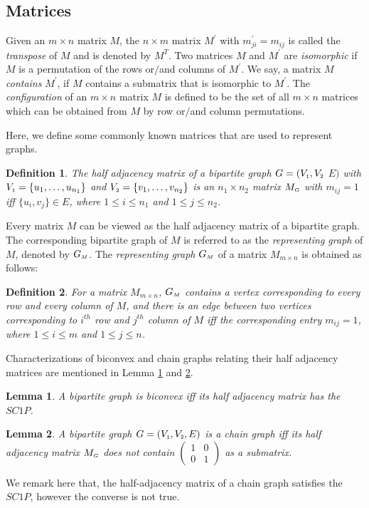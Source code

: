 \documentclass[review, 1p]{elsarticle}
\newtheorem{lemma}{Lemma}
\newtheorem{definition}{Definition}
\begin{document}
\subsection{\textbf{Matrices}} \noindent Given an  $m \times n$ matrix $M$, the $n \times m$ matrix $M^{'}$ with $m_{ji}^{'} = m_{ij}$ is called the \textit{transpose} of $M$ and is denoted by $M^{T}$. Two matrices $M$ and $M^{'}$ are \textit{isomorphic} if $M$ is a permutation of the rows or$/$and columns of $M^{'}$. We say, a matrix $M$ \textit{contains} $M^{'}$, if $M$ contains a submatrix that  is isomorphic to $M^{'}$. The \textit{configuration} \label{config} of an $m \times n$ matrix $M$ is defined to be the set of all  $m \times n$ matrices which can be obtained from $M$ by row or$/$and column permutations. 

\noindent Here, we define some commonly known matrices that are used to represent graphs.
\begin{definition}\label{defn4}\textup{
The \textit{half adjacency matrix} \cite{dom2009recognition} of a bipartite graph $G=(V_{\mathsmaller{1}},V_{\mathsmaller{2}}$ $E)$ with $V_{\mathsmaller{1}} = \{u_{1}, \ldots, u_{n_{1}}\}$ and $V_{\mathsmaller{2}} = \{v_{1},\ldots, v_{n_{2}}\}$ is an $n_{1} \times n_{2}$ matrix $M_{\mathsmaller{G}}$  with $m_{ij} = 1$ iff $\{u_{i} , v_{j} \} \in  E$, where $1 \leq i \leq n_{1}$ and $1 \leq j \leq n_{2}$.}
\end{definition}
\noindent Every matrix $M$ can be viewed as the half adjacency matrix of a bipartite graph. The corresponding bipartite graph of $M$ is referred to as the \textit{representing graph} of $M$, denoted by $G_{\mathsmaller{M}}$. The \textit{representing graph} $G_{\mathsmaller{M}}$ \cite{dom2009recognition} of a matrix $M_{m \times n}$ is obtained as follows:
\begin{definition}\label{defn5}
\textup{For a matrix $M_{m \times n}$, $G_{\mathsmaller{M}}$ contains a vertex corresponding to every row and every column of $M$, and there is an edge between two vertices corresponding to $i^{th}$ row and $j^{th}$ column of $M$ iff the corresponding entry $m_{ij}= 1$, where $1 \leq i \leq m$ and $1 \leq j \leq n$.}
\end{definition}  
Characterizations of biconvex and chain graphs relating their half adjacency matrices are mentioned in Lemma \ref{biconvexlemm} and \ref{chnrs}.
\begin{lemma}\textup{\cite{tucker1972structure}} \label{biconvexlemm}
A bipartite graph is biconvex iff its half adjacency matrix has the $SC1P$.
\end{lemma}
\begin{lemma} \textup{\cite{yannakakis1981computing}}\label{chnrs}
A bipartite graph $G=(V_{\mathsmaller{1}}, V_{\mathsmaller{2}}, E)$ is a chain graph iff  its half adjacency matrix $M_{\mathsmaller{G}}$ does not contain $\begin{pmatrix}1 & 0\\ 0 & 1\end{pmatrix}$ as a submatrix. \end{lemma}
\noindent We remark here that, the half-adjacency matrix of a chain graph satisfies the $SC1P$, however the converse is not true.
\end{document}
